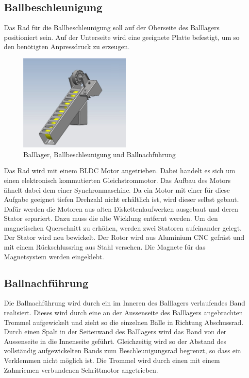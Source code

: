 \subsection{Ballbeschleunigung}
Das Rad für die Ballbeschleunigung soll auf der Oberseite des Balllagers 
positioniert sein. Auf der Unterseite wird eine geeignete Platte befestigt, um 
so den benötigten Anpressdruck zu erzeugen. 
\begin{figure}[h!]          
	\centering             
	\includegraphics[width=0.5\textwidth]{fig/Balllager.jpg}    
	\caption{Balllager, Ballbeschleunigung und Ballnachführung}
	\label{fig:Balllager} 
\end{figure}
Das Rad wird mit einem BLDC Motor angetrieben. Dabei handelt es sich um einen 
elektronisch kommutierten Gleichstrommotor. Das Aufbau des Motors ähnelt dabei 
dem einer Synchronmaschine. Da ein Motor mit einer für diese Aufgabe geeignet 
tiefen Drehzahl nicht erhältlich ist, wird dieser selbst gebaut. Dafür werden 
die Motoren aus alten Diskettenlaufwerken ausgebaut und deren Stator separiert. 
Dazu muss die alte Wicklung entfernt werden. Um den magnetischen Querschnitt 
zu erhöhen, werden zwei Statoren aufeinander gelegt. Der Stator wird neu 
bewickelt. Der Rotor wird aus Aluminium CNC gefräst und mit einem 
Rückschlussring aus Stahl versehen. Die Magnete für das Magnetsystem werden 
eingeklebt. 

\subsection{Ballnachführung}
Die Ballnachführung wird durch ein im Inneren des Balllagers verlaufendes Band 
realisiert. Dieses wird durch eine an der Aussenseite des Balllagers 
angebrachten Trommel aufgewickelt und zieht so die einzelnen Bälle in Richtung 
Abschussrad. Durch einen Spalt in der Seitenwand des Balllagers wird das Band 
von der Aussenseite in die Innenseite geführt. Gleichzeitig wird so der 
Abstand des vollständig aufgewickelten Bands zum Beschleunigungsrad begrenzt, 
so dass ein Verklemmen nicht möglich ist.
Die Trommel wird durch einen mit einem Zahnriemen verbundenen Schrittmotor angetrieben.

